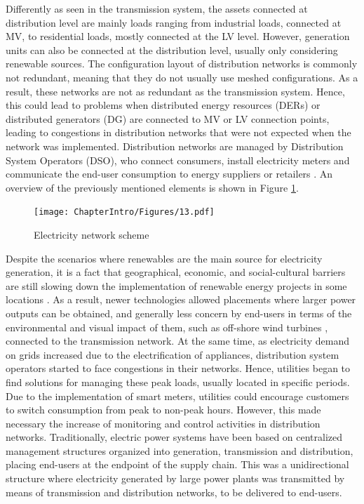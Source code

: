 Differently as seen in the transmission system, the assets connected at distribution level are mainly loads ranging from industrial loads, connected at MV, to residential loads, mostly connected at the LV level. However, generation units can also be connected  at the distribution level, usually only considering renewable sources. The configuration layout of distribution networks is commonly not redundant, meaning that they do not usually use meshed configurations. As a result, these networks are not as redundant as the transmission system. Hence, this could lead to problems when distributed energy resources (DERs) or distributed generators (DG) are connected to MV or LV connection points, leading to congestions  in distribution networks that were not expected when the network was implemented. Distribution networks are managed by Distribution System Operators (DSO), who connect consumers, install electricity meters and communicate the end-user consumption to energy suppliers or retailers \cite{Erbach2016}. An overview of the previously mentioned elements is shown in Figure \ref{fig:networkscheme}. 


\begin{figure}[htbp]
	\centering 
	\texttt{[image: ChapterIntro/Figures/13.pdf]}
		\caption{Electricity network scheme}  
		\label{fig:networkscheme}
\end{figure}


Despite the scenarios where renewables are the main source for electricity generation, it is a fact that geographical, economic, and social-cultural barriers are still slowing down the implementation of renewable energy projects in some locations \cite{ASANTE2020111479, barriers2020}. As a result, newer technologies allowed placements where larger power outputs can be obtained, and generally less concern by end-users in terms of the environmental and visual impact of them, such as off-shore wind turbines \cite{Kaldellis2016, KPMG2019}, connected to the transmission network. At the same time, as electricity demand on grids increased due to the electrification of appliances, distribution system operators started to face congestions in their networks. Hence, utilities began to find solutions for managing these peak loads, usually located in specific periods. Due to the implementation of smart meters, utilities could encourage customers to switch consumption from peak to non-peak hours. However, this made necessary the increase of monitoring and control activities in distribution networks. 
Traditionally, electric power systems have been based on centralized management structures organized into generation, transmission and distribution, placing end-users at the endpoint of the supply chain. This was a unidirectional structure where electricity generated by large power plants was transmitted by means of transmission and distribution networks, to be delivered to end-users. 

